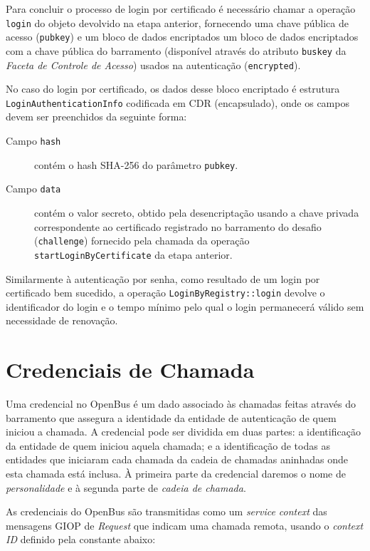 \documentclass[]{article}
\newcommand{\term}[1]{\textit{#1}}
\newcommand{\code}[1]{\texttt{#1}}
\begin{document}
Para concluir o processo de login por certificado é necessário chamar a operação \code{login} do objeto devolvido na etapa anterior, fornecendo uma chave pública de acesso (\code{pubkey}) e um bloco de dados encriptados um bloco de dados encriptados com a chave pública do barramento (disponível através do atributo \code{buskey} da \term{Faceta de Controle de Acesso}) usados na autenticação (\code{encrypted}).

No caso do login por certificado, os dados desse bloco encriptado é estrutura \code{LoginAuthenticationInfo} codificada em CDR (encapsulado), onde os campos devem ser preenchidos da seguinte forma:

\begin{description}
	\item[Campo \code{hash}] contém o hash SHA-256 do parâmetro \code{pubkey}.
	\item[Campo \code{data}] contém o valor secreto, obtido pela desencriptação usando a chave privada correspondente ao certificado registrado no barramento do desafio (\code{challenge}) fornecido pela chamada da operação \code{startLoginByCertificate} da etapa anterior.
\end{description}

Similarmente à autenticação por senha, como resultado de um login por certificado bem sucedido, a operação \code{LoginByRegistry::login} devolve o identificador do login e o tempo mínimo pelo qual o login permanecerá válido sem necessidade de renovação.



\section{Credenciais de Chamada} %
\label{sec:credenciais_de_chamada}

Uma credencial no OpenBus é um dado associado às chamadas feitas através do barramento que assegura a identidade da entidade de autenticação de quem iniciou a chamada.
A credencial pode ser dividida em duas partes: a identificação da entidade de quem iniciou aquela chamada; e a identificação de todas as entidades que iniciaram cada chamada da cadeia de chamadas aninhadas onde esta chamada está inclusa.
À primeira parte da credencial daremos o nome de \term{personalidade} e à segunda parte de \term{cadeia de chamada}.

As credenciais do OpenBus são transmitidas como um \term{service context} das mensagens GIOP de \term{Request} que indicam uma chamada remota, usando o  \term{context ID} definido pela constante abaixo:
\end{document}
